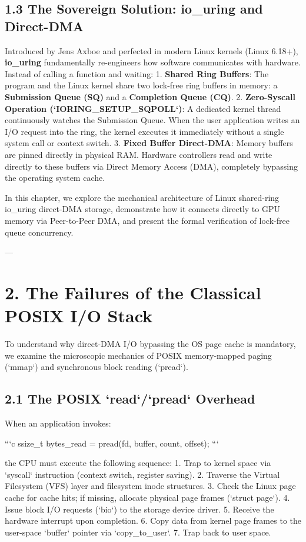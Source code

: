 \documentclass[11pt,twoside,openright]{amsbook}
\begin{document}
{{{{{{{\subsection{1.3 The Sovereign Solution: io_uring and Direct-DMA}
Introduced by Jens Axboe and perfected in modern Linux kernels (Linux 6.18+), \textbf{io_uring} fundamentally re-engineers how software communicates with hardware.
Instead of calling a function and waiting:
1. \textbf{Shared Ring Buffers}: The program and the Linux kernel share two lock-free ring buffers in memory: a \textbf{Submission Queue (SQ)} and a \textbf{Completion Queue (CQ)}.
2. \textbf{Zero-Syscall Operation (`IORING_SETUP_SQPOLL`)}: A dedicated kernel thread continuously watches the Submission Queue. When the user application writes an I/O request into the ring, the kernel executes it immediately without a single system call or context switch.
3. \textbf{Fixed Buffer Direct-DMA}: Memory buffers are pinned directly in physical RAM. Hardware controllers read and write directly to these buffers via Direct Memory Access (DMA), completely bypassing the operating system cache.

In this chapter, we explore the mechanical architecture of Linux shared-ring io_uring direct-DMA storage, demonstrate how it connects directly to GPU memory via Peer-to-Peer DMA, and present the formal verification of lock-free queue concurrency.

---

\section{2. The Failures of the Classical POSIX I/O Stack}

To understand why direct-DMA I/O bypassing the OS page cache is mandatory, we examine the microscopic mechanics of POSIX memory-mapped paging (`mmap`) and synchronous block reading (`pread`).

\subsection{2.1 The POSIX `read`/`pread` Overhead}

When an application invokes:

```c
ssize_t bytes_read = pread(fd, buffer, count, offset);
```

the CPU must execute the following sequence:
1. Trap to kernel space via `syscall` instruction (context switch, register saving).
2. Traverse the Virtual Filesystem (VFS) layer and filesystem inode structures.
3. Check the Linux page cache for cache hits; if missing, allocate physical page frames (`struct page`).
4. Issue block I/O requests (`bio`) to the storage device driver.
5. Receive the hardware interrupt upon completion.
6. Copy data from kernel page frames to the user-space `buffer` pointer via `copy_to_user`.
7. Trap back to user space.

}}}}}}}
\end{document}
